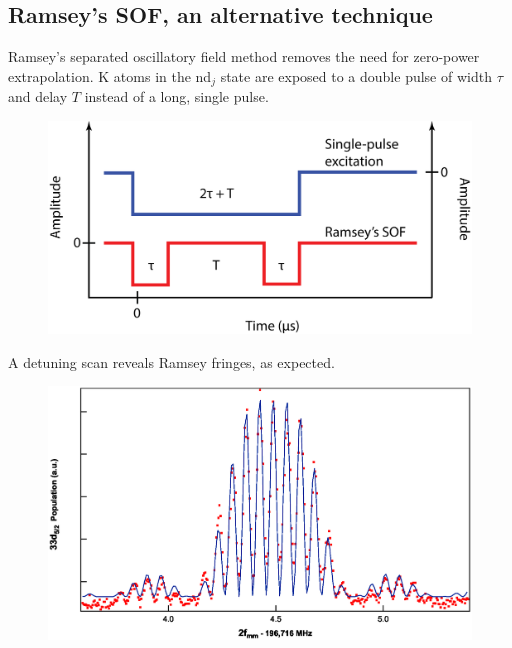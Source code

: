 \documentclass[landscape]{sciposter}
\begin{document}
\begin{multicols}{4}
\section*{\large Ramsey's SOF, an alternative technique}
Ramsey's separated oscillatory field method removes the need for zero-power extrapolation. K atoms in the nd$_j$ state are exposed to a double pulse of width $\tau$ and delay $T$ instead of a long, single pulse. 

\begin{figure}
\begin{center}
\includegraphics[scale=1]{Ramsey_excitation.png}
\caption{}
\label{excitation scheme}
\end{center}
\end{figure}

A detuning scan reveals Ramsey fringes, as expected.

\begin{figure}
	\begin{center}
		\includegraphics[scale = 1]{fringes.eps}
		\caption{ }
		\label{Ramsey fringes}
	\end{center}
\end{figure}


\end{multicols}
\end{document}
